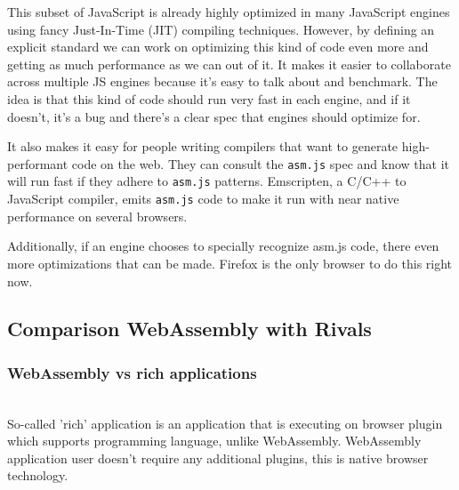 This subset of JavaScript is already highly optimized in many JavaScript engines using fancy Just-In-Time (JIT) compiling techniques. 
However, by defining an explicit standard we can work on optimizing this kind of code even more and getting as much performance as we can out of it. 
It makes it easier to collaborate across multiple JS engines because it's easy to talk about and benchmark. 
The idea is that this kind of code should run very fast in each engine, and if it doesn't, it's a bug and there's a clear spec that engines should optimize for.

It also makes it easy for people writing compilers that want to generate high-performant code on the web. 
They can consult the \texttt{asm.js} spec and know that it will run fast if they adhere to \texttt{asm.js} patterns. 
Emscripten, a C/C++ to JavaScript compiler, emits \texttt{asm.js} code to make it run with near native performance on several browsers.

Additionally, if an engine chooses to specially recognize asm.js code, there even more optimizations that can be made. 
Firefox is the only browser to do this right now.

\subsection{Comparison WebAssembly with Rivals}
\subsubsection{WebAssembly vs rich applications}\mbox{}\\
So-called 'rich' application is an application that is executing on browser plugin which supports programming language, unlike WebAssembly.
WebAssembly application user doesn't require any additional plugins, this is native browser technology.

